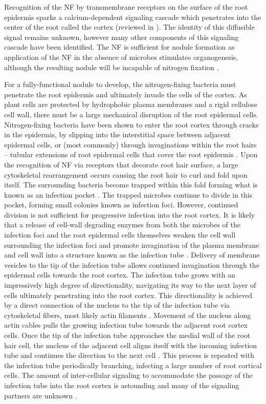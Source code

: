Recognition of the NF by transmembrane receptors on the surface of
the root epidermis sparks a calcium-dependent signaling cascade which penetrates
into the center of the root called the cortex (reviewed in
\citet{Oldroyd:2004dv, Oldroyd:2008hd}). The identity of this diffusible signal
remains unknown, however many other components of this signaling cascade have
been identified. The NF is sufficient for
nodule formation as application of the NF in the absence of microbes stimulates
organogenesis, although the resulting nodule will be incapable of nitrogen
fixation \cite{Truchet:1991tu}. 

For a fully-functional nodule to develop, the nitrogen-fixing bacteria 
must penetrate the root epidermis and ultimately invade the cells of the cortex.
As plant cells are protected by hydrophobic plasma membranes and a rigid
cellulose cell wall, there must be a large mechanical disruption of the root
epidermal cells. Nitrogen-fixing bacteria have been shown to enter the root
cortex through cracks in the epidermis, by slipping into the interstitial space
between adjacent epidermal cells, or (most commonly) through invaginations
within the root hairs -- tubular extensions of root epidermal cells that cover the
root
epidermis \cite{Oldroyd:2011ej, Gage:2004ee, Grierson:2002jf}. Upon the
recognition of NF via receptors that decorate root hair surface, a
large cytoskeletal rearrangement occurs causing the root hair to curl and fold upon
itself. The surrounding bacteria become trapped within this fold
forming what is known as an infection pocket \cite{Geurts:2005jx}. The trapped
microbes continue to divide in this pocket, forming small colonies known as
infection foci. However, continued division is not sufficient for
progressive infection into the root cortex. It is likely that a release of
cell-wall degrading enzymes from both the microbes of the infection foci and the
root epidermal cells themselves weaken the cell wall surrounding the infection
foci and
promote invagination of the plasma membrane and cell wall into a structure known as the
infection tube \cite{Ridge:1985wo}. Delivery of membrane vesicles to the tip of
the infection tube allows continued invagination through the epidermal cells
towards the root cortex. The
infection tube grows with an impressively high degree of directionality,
navigating its way to the next
layer of cells ultimately penetrating into the root cortex. This directionality
is achieved by a direct connection of the nucleus to the tip of the infection tube
via cytoskeletal fibers, most likely actin filaments
\cite{MonahanGiovanelli:2006ki}. Movement of the nucleus along actin
cables pulls the growing infection tube towards the adjacent root cortex cells.
Once the tip of the infection tube approaches the medial wall of the root hair
cell, the nucleus of the adjacent cell aligns itself with the incoming infection
tube and continues the direction to
the next cell \cite{Gage:2004ee}. This process is repeated with the infection
tube periodically branching, infecting a large number of root cortical cells.
The amount of inter-cellular signaling to accommodate the passage of the
infection tube into the root cortex is astounding and many of the signaling
partners are unknown \cite{Oldroyd:2011ej}.

